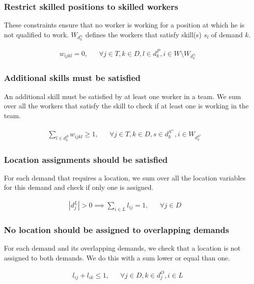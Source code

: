 \documentclass[../../thesis.tex]{subfiles}
\begin{document}
\subsubsection{Restrict skilled positions to skilled workers}

These constraints ensure that no worker is working for a position at which he is not qualified to work.
$W_{d^{s_l}_k}$ defines the workers that satisfy skill(s) $s_l$ of demand $k$. 

\begin{align}
  w_{ijkl} = 0, && \forall j \in T, k \in D, l \in d^P_k, i \in W \setminus W_{d^{s_l}_k}  \label{wc6}
\end{align}

\subsubsection{Additional skills must be satisfied}

An additional skill must be satisfied by at least one worker in a team. We sum 
over all the workers that satisfy the skill to check if at least one is working in the team.

\begin{align}
  \sum_{l \in d_k^P} w_{ijkl} \geq 1, && \forall j \in T, k \in D, s \in d^{S^+}_k, i \in W_{d^{S^+}_k}& \label{wc8}
\end{align}


\subsubsection{Location assignments should be satisfied}

For each demand that requires a location, we sum over all the location variables for this demand and check if only one is assigned.

\begin{align}
  |d^L_j| > 0 \implies \sum_{i \in L} l_{ij} = 1, && \forall j \in D& \label{lc2}
\end{align}

\subsubsection{No location should be assigned to overlapping demands}

For each demand and its overlapping demands, we check that a location is not assigned to both demands.
We do this with a sum lower or equal than one.

\begin{align}
  l_{ij} + l_{ik} \leq 1, && \forall j \in D, k \in d^O_j, i \in L \label{lc3}
\end{align}
\end{document}
